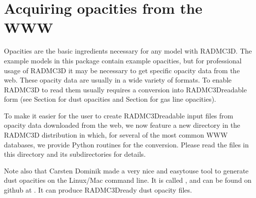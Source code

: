 \documentclass[letterpaper,10pt,english]{sphinxmanual}
\begin{document}
\chapter{Acquiring opacities from the WWW}
\label{\detokenize{opacitieswww:acquiring-opacities-from-the-www}}\label{\detokenize{opacitieswww:chap-acquiring-opacities}}\label{\detokenize{opacitieswww::doc}}
Opacities are the basic ingredients necessary for any model with
RADMC\sphinxhyphen{}3D. The example models in this package contain example opacities, but
for professional usage of RADMC\sphinxhyphen{}3D it may be necessary to get specific
opacity data from the web. These opacity data are usually in a wide variety
of formats. To enable RADMC\sphinxhyphen{}3D to read them usually requires a conversion
into RADMC\sphinxhyphen{}3D\sphinxhyphen{}readable form (see Section {\hyperref[\detokenize{inputoutputfiles:sec-opacities}]{}} for dust
opacities and Section {\hyperref[\detokenize{lineradtrans:sec-molecule-xxx-inp}]{}} for gas line opacities).

To make it easier for the user to create RADMC\sphinxhyphen{}3D\sphinxhyphen{}readable input files
from opacity data downloaded from the web, we now feature a new directory
 in the RADMC\sphinxhyphen{}3D distribution in which, for several of
the most common WWW databases, we provide Python routines for the conversion.
Please read the  files in this directory and its
subdirectories for details.

Note also that Carsten Dominik made a very nice and easy\sphinxhyphen{}to\sphinxhyphen{}use tool to
generate dust opacities on the Linux/Mac command line. It is called
, and can be found on github at
 .
It can produce RADMC\sphinxhyphen{}3D\sphinxhyphen{}ready dust opacity files.
\end{document}
